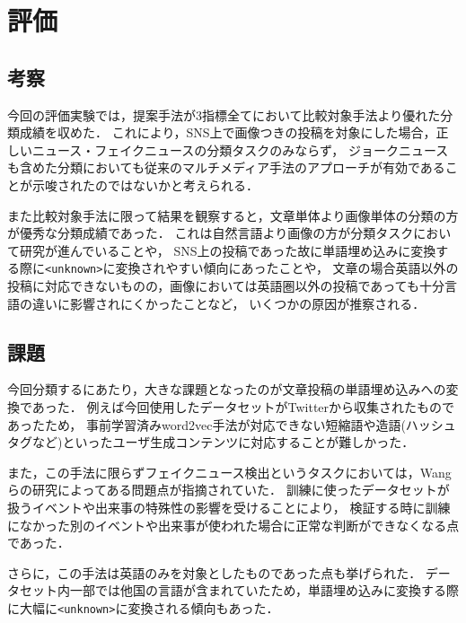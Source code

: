 \chapter{評価}\label{ch:evaluate}

\section{考察}
今回の評価実験では，提案手法が3指標全てにおいて比較対象手法より優れた分類成績を収めた．
これにより，SNS上で画像つきの投稿を対象にした場合，正しいニュース・フェイクニュースの分類タスクのみならず，
ジョークニュースも含めた分類においても従来のマルチメディア手法のアプローチが有効であることが示唆されたのではないかと考えられる．

また比較対象手法に限って結果を観察すると，文章単体より画像単体の分類の方が優秀な分類成績であった．
これは自然言語より画像の方が分類タスクにおいて研究が進んでいることや，
SNS上の投稿であった故に単語埋め込みに変換する際に\texttt{<unknown>}に変換されやすい傾向にあったことや，
文章の場合英語以外の投稿に対応できないものの，画像においては英語圏以外の投稿であっても十分言語の違いに影響されにくかったことなど，
いくつかの原因が推察される．

\section{課題}
今回分類するにあたり，大きな課題となったのが文章投稿の単語埋め込みへの変換であった．
例えば今回使用したデータセットがTwitterから収集されたものであったため，
事前学習済みword2vec手法が対応できない短縮語や造語(ハッシュタグなど)といったユーザ生成コンテンツに対応することが難しかった．

また，この手法に限らずフェイクニュース検出というタスクにおいては，Wangらの研究\cite{Wang:2018:EEA:3219819.3219903}によってある問題点が指摘されていた．
訓練に使ったデータセットが扱うイベントや出来事の特殊性の影響を受けることにより，
検証する時に訓練になかった別のイベントや出来事が使われた場合に正常な判断ができなくなる点であった．

さらに，この手法は英語のみを対象としたものであった点も挙げられた．
データセット内一部では他国の言語が含まれていたため，単語埋め込みに変換する際に大幅に\texttt{<unknown>}に変換される傾向もあった．
%